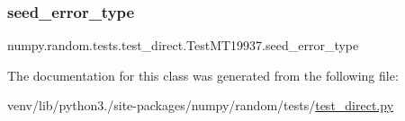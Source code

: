 \subsubsection{\texorpdfstring{seed\+\_\+error\+\_\+type}{seed\_error\_type}}
{\footnotesize\ttfamily numpy.\+random.\+tests.\+test\+\_\+direct.\+Test\+M\+T19937.\+seed\+\_\+error\+\_\+type}



The documentation for this class was generated from the following file\+:\begin{DoxyCompactItemize}
\item 
venv/lib/python3./site-\/packages/numpy/random/tests/\hyperlink{test__direct_8py}{test\+\_\+direct.\+py}\end{DoxyCompactItemize}
